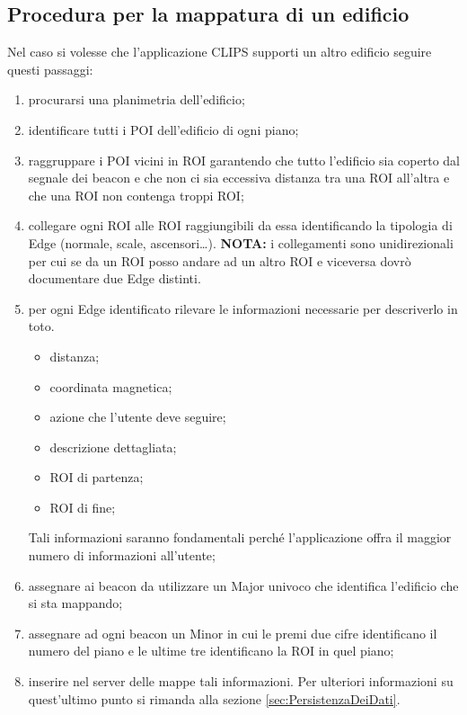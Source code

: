 \documentclass[../ManualeSviluppatore.tex]{subfiles}
\begin{document}
	\subsection{Procedura per la mappatura di un edificio}
		Nel caso si volesse che l'applicazione CLIPS supporti un altro edificio seguire questi passaggi:
		\begin{enumerate}
			\item procurarsi una planimetria dell'edificio;
			\item identificare tutti i POI dell'edificio di ogni piano;
			\item raggruppare i POI vicini in ROI garantendo che tutto l'edificio sia coperto dal segnale dei beacon e che non ci sia eccessiva distanza tra una ROI all'altra e che una ROI non contenga troppi ROI;
			\item collegare ogni ROI alle ROI raggiungibili da essa identificando la tipologia di Edge (normale, scale, ascensori\dots). \textbf{NOTA:} i collegamenti sono unidirezionali per cui se da un ROI posso andare ad un altro ROI e viceversa dovrò documentare due Edge distinti.
			\item per ogni Edge identificato rilevare le informazioni necessarie per descriverlo in toto. 
			\begin{itemize}
				\item distanza;
				\item coordinata magnetica;
				\item azione che l'utente deve seguire;
				\item descrizione dettagliata;
				\item ROI di partenza;
				\item ROI di fine;
			\end{itemize}
			Tali informazioni saranno fondamentali perché l'applicazione offra il maggior numero di informazioni all'utente;
			\item assegnare ai \gls{beacon} da utilizzare un Major univoco che identifica l'edificio che si sta mappando;
			\item assegnare ad ogni \gls{beacon} un Minor in cui le premi due cifre identificano il numero del piano e le ultime tre identificano la ROI in quel piano;
			\item inserire nel server delle mappe tali informazioni. Per ulteriori informazioni su quest'ultimo punto si rimanda alla sezione \ref{sec:PersistenzaDeiDati}.
		\end{enumerate}
\end{document}
